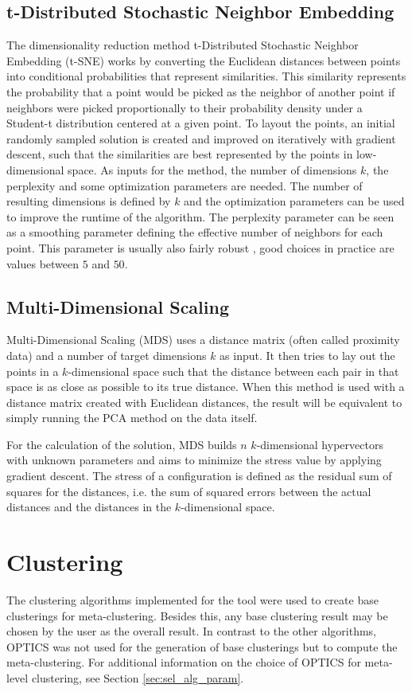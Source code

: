 \documentclass[
	a4paper,
	english,
	twoside,
	openright,               
	11pt                            
	]{report}
\begin{document}
\subsection{t-Distributed Stochastic Neighbor Embedding}
The dimensionality reduction method t-Distributed Stochastic Neighbor Embedding (t-SNE) \cite{Maaten2008VisualizingDU} works by converting the Euclidean distances between points into conditional probabilities that represent similarities. This similarity represents the probability that a point would be picked as the neighbor of another point if neighbors were picked proportionally to their probability density under a Student-t distribution centered at a given point. To layout the points, an initial randomly sampled solution is created and improved on iteratively with gradient descent, such that the similarities are best represented by the points in low-dimensional space. As inputs for the method, the number of dimensions $k$, the perplexity and some optimization parameters are needed. The number of resulting dimensions is defined by $k$ and the optimization parameters can be used to improve the runtime of the algorithm. The perplexity parameter can be seen as a smoothing parameter defining the effective number of neighbors for each point. This parameter is usually also fairly robust \cite{Maaten2008VisualizingDU}, good choices in practice are values between $5$ and $50$.

\subsection{Multi-Dimensional Scaling}
Multi-Dimensional Scaling (MDS) \cite{mds} uses a distance matrix (often called proximity data) and a number of target dimensions $k$ as input. It then tries to lay out the points in a $k$-dimensional space such that the distance between each pair in that space is as close as possible to its true distance. When this method is used with a distance matrix created with Euclidean distances, the result will be equivalent to simply running the PCA method on the data itself. 

For the calculation of the solution, MDS builds $n$ $k$-dimensional hypervectors with unknown parameters and aims to minimize the stress value by applying gradient descent. The stress of a configuration is defined as the residual sum of squares for the distances, i.e. the sum of squared errors between the actual distances and the distances in the $k$-dimensional space.

\section{Clustering}\label{theory_clustering}
The clustering algorithms implemented for the tool were used to create base clusterings for meta-clustering. Besides this, any base clustering result may be chosen by the user as the overall result. In contrast to the other algorithms, OPTICS was not used for the generation of base clusterings but to compute the meta-clustering. For additional information on the choice of OPTICS for meta-level clustering, see Section \ref{sec:sel_alg_param}.
\end{document}
